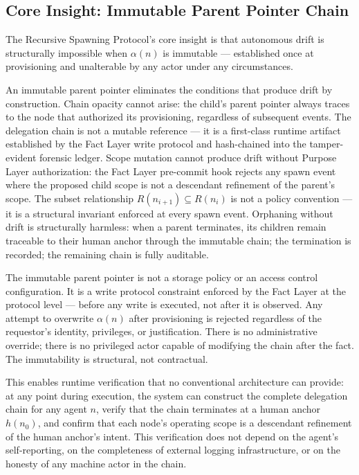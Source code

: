 \subsection{Core Insight: Immutable Parent Pointer Chain}

The Recursive Spawning Protocol's core insight is that autonomous drift is structurally impossible when $\alpha(n)$ is immutable — established once at provisioning and unalterable by any actor under any circumstances.

An immutable parent pointer eliminates the conditions that produce drift by construction. Chain opacity cannot arise: the child's parent pointer always traces to the node that authorized its provisioning, regardless of subsequent events. The delegation chain is not a mutable reference — it is a first-class runtime artifact established by the Fact Layer write protocol and hash-chained into the tamper-evident forensic ledger. Scope mutation cannot produce drift without Purpose Layer authorization: the Fact Layer pre-commit hook rejects any spawn event where the proposed child scope is not a descendant refinement of the parent's scope. The subset relationship $R(n_{i+1}) \subseteq R(n_i)$ is not a policy convention — it is a structural invariant enforced at every spawn event. Orphaning without drift is structurally harmless: when a parent terminates, its children remain traceable to their human anchor through the immutable chain; the termination is recorded; the remaining chain is fully auditable.

The immutable parent pointer is not a storage policy or an access control configuration. It is a write protocol constraint enforced by the Fact Layer at the protocol level — before any write is executed, not after it is observed. Any attempt to overwrite $\alpha(n)$ after provisioning is rejected regardless of the requestor's identity, privileges, or justification. There is no administrative override; there is no privileged actor capable of modifying the chain after the fact. The immutability is structural, not contractual.

This enables runtime verification that no conventional architecture can provide: at any point during execution, the system can construct the complete delegation chain for any agent $n$, verify that the chain terminates at a human anchor $h(n_0)$, and confirm that each node's operating scope is a descendant refinement of the human anchor's intent. This verification does not depend on the agent's self-reporting, on the completeness of external logging infrastructure, or on the honesty of any machine actor in the chain.

